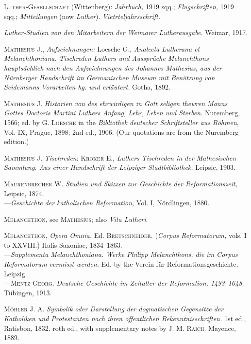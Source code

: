 \textsc{Luther-Gesellschaft} (Wittenberg): \textit{Jahrbuch,} 1919 sqq.; \textit{Flugschriften,}
1919 sqq.; \textit{Mitteilungen} (now \textit{Luther}). \textit{Vietrteljahrsschrift.}

\textit{Luther-Studien von den Mitarbeitern der Weimarer Lutherausgabe.} Weimar,
1917.

\textsc{Mathesius J.}, \textit{Aufzeichnungen:} Loesche G., \textit{Analecta Lutherana et Melanchthoniana.
Tischreden Luthers und Aussprüche Melanchthons hauptsächlich
nach den Aufzeichnungen des Johannes Mathesius, aus der Nürnberger
Handschrift im Germanischen Museum mit Benützung von Seidemanns
Vorarbeiten hg. und erläutert.} Gotha, 1892.

\textsc{Mathesius J.} \textit{Historien von des ehrwirdigen in Gott seligen thewren Manns
Gottes Doctoris Martini Luthers Anfang, Lehr, Leben und Sterben.}
Nuremberg, 1566; ed. by \textsc{G. Loesche} in the \textit{Bibliothek deutscher Schriftsteller
aus Böhmen}, Vol. IX, Prague, 1898; 2nd ed., 1906. (Our quotations
are from the Nuremberg edition.)

\textsc{Mathesius J.} \textit{Tischreden}: \textsc{Kroker E.}, \textit{Luthers Tischreden in der Mathesischen
Sammlung. Aus einer Handschrift der Leipziger Stadtbibliothek.} Leipsic,
1903.

\textsc{Maurenbrecher W.} \textit{Studien und Skizzen zur Geschichte der Reformationszeit,}
Leipsic, 1874. \\
---\textit{Geschichte der katholischen Reformation,} Vol. I, Nördlingen, 1880.

\textsc{Melanchthon}, see \textsc{Mathesius}; also \textit{Vita Lutheri}.

\textsc{Melanchthon}, \textit{Opera Omnia.} Ed. \textsc{Bretschneider.} (\textit{Corpus Reformatorum,}
vols. I to XXVIII.) Halis Saxoniae, 1834--1863. \\
---\textit{Supplementa Melanchthoniana. Werke Philipp Melanchthons, die im
Corpus Reformatorum vermisst werden.} Ed. by the Verein für Reformationsgeschichte, Leipzig. \\
---\textsc{Mentz Georg.} \textit{Deutsche Geschichte im Zeitalter der Reformation, 1493--1648.}
Tübingen, 1913.

\textsc{Möhler J. A.} \textit{Symbolik oder Darstellung der dogmatischen Gegensitze der
Katholiken und Protestanten nach ihren öffentlichen Bekenntnisschriften.}
1st ed., Ratisbon, 1832. roth ed., with supplementary notes by \textsc{J. M.
Raich.} Mayence, 1889.

